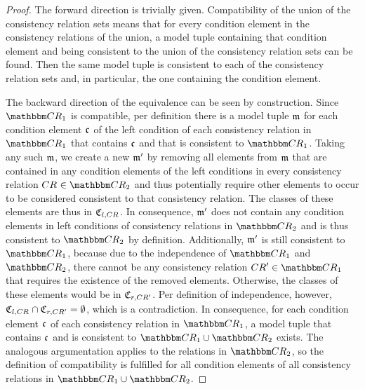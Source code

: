 \begin{proof}
    The forward direction is trivially given. 
    Compatibility of the union of the consistency relation sets means that for every condition element in the consistency relations of the union, a model tuple containing that condition element and being consistent to the union of the consistency relation sets can be found. Then the same model tuple is consistent to each of the consistency relation sets and, in particular, the one containing the condition element.

    The backward direction of the equivalence can be seen by construction.
    Since $\consistencyrelationset{CR}_{1}$ is compatible, per definition there is a model tuple $\modeltuple{m}$ for each condition element $\conditionelement{c}{}$ of the left condition of each consistency relation in $\consistencyrelationset{CR}_{1}$ that contains $\conditionelement{c}{}$ and that is consistent to $\consistencyrelationset{CR}_{1}$.
    Taking any such $\modeltuple{m}$, we create a new $\modeltuple{m'}$ by removing all elements from $\modeltuple{m}$ that are contained in any condition elements of the left conditions in every consistency relation $\consistencyrelation{CR}{} \in \consistencyrelationset{CR}_{2}$ and thus potentially require other elements to occur to be considered consistent to that consistency relation.
    The classes of these elements are thus in $\classtuple{C}{l,\consistencyrelation{CR}{}}$.
    In consequence, $\modeltuple{m'}$ does not contain any condition elements in left conditions of consistency relations in $\consistencyrelationset{CR}_{2}$ and is thus consistent to $\consistencyrelationset{CR}_{2}$ by definition. 
    Additionally, $\modeltuple{m'}$ is still consistent to $\consistencyrelationset{CR}_{1}$, because due to the independence of $\consistencyrelationset{CR}_{1}$ and $\consistencyrelationset{CR}_{2}$, there cannot be any consistency relation $\consistencyrelation{CR}{}' \in \consistencyrelationset{CR}_{1}$ that requires the existence of the removed elements.
    Otherwise, the classes of these elements would be in $\classtuple{C}{r,\consistencyrelation{CR}{}'}$.
    Per definition of independence, however, $\classtuple{C}{l,\consistencyrelation{CR}{}} \cap \classtuple{C}{r,\consistencyrelation{CR}{}'} = \emptyset$, which is a contradiction.
    In consequence, for each condition element $\conditionelement{c}{}$ of each consistency relation in $\consistencyrelationset{CR}_{1}$, a model tuple that contains $\conditionelement{c}{}$ and is consistent to $\consistencyrelationset{CR}_{1} \cup \consistencyrelationset{CR}_{2}$ exists.
    The analogous argumentation applies to the relations in $\consistencyrelationset{CR}_{2}$, so the definition of compatibility is fulfilled for all condition elements of all consistency relations in $\consistencyrelationset{CR}_{1} \cup \consistencyrelationset{CR}_{2}$.
\end{proof}

